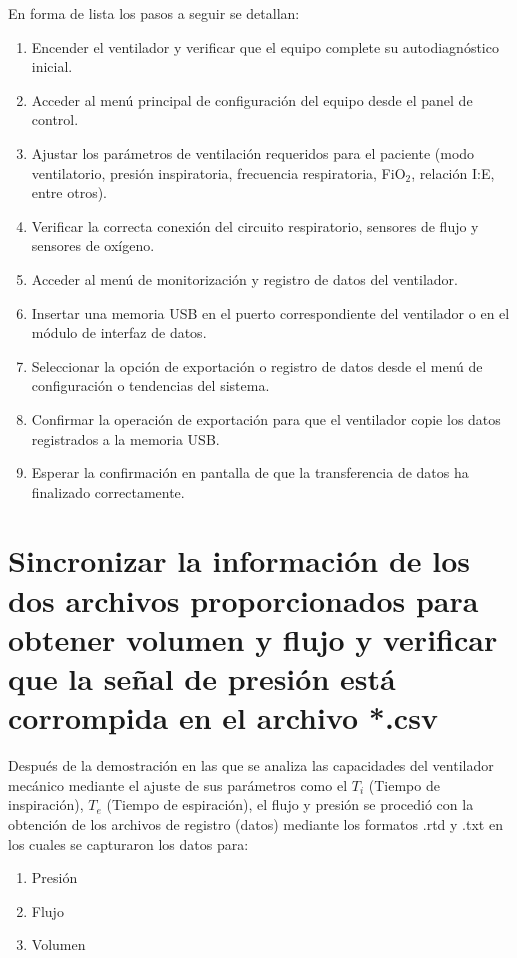 En forma de lista los pasos a seguir se detallan: 
\begin{enumerate}
	\item Encender el ventilador y verificar que el equipo complete su autodiagnóstico inicial.
	\item Acceder al menú principal de configuración del equipo desde el panel de control.
	\item Ajustar los parámetros de ventilación requeridos para el paciente (modo ventilatorio, presión inspiratoria, frecuencia respiratoria, FiO$_2$, relación I:E, entre otros).
	\item Verificar la correcta conexión del circuito respiratorio, sensores de flujo y sensores de oxígeno.
	\item Acceder al menú de monitorización y registro de datos del ventilador.
	\item Insertar una memoria USB en el puerto correspondiente del ventilador o en el módulo de interfaz de datos.
	\item Seleccionar la opción de exportación o registro de datos desde el menú de configuración o tendencias del sistema.
	\item Confirmar la operación de exportación para que el ventilador copie los datos registrados a la memoria USB.
	\item Esperar la confirmación en pantalla de que la transferencia de datos ha finalizado correctamente.
\end{enumerate}


\section{Sincronizar la información de los dos archivos proporcionados para obtener volumen y flujo y verificar que la señal de presión está corrompida en el archivo *.csv}

Después de la demostración en las que se analiza las capacidades del ventilador mecánico mediante el ajuste de sus parámetros como el $T_i$ (Tiempo de inspiración), $T_e$ (Tiempo de espiración), el flujo y presión se procedió con la obtención de los archivos de registro (datos) mediante los formatos .rtd y .txt en los cuales se capturaron los datos para:

\begin{enumerate}
	\item Presión
	\item Flujo
	\item Volumen
\end{enumerate}


